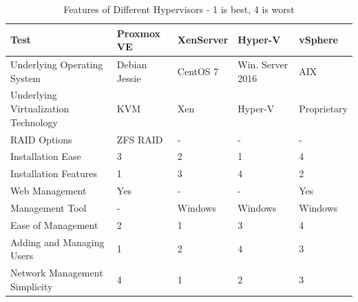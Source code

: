 \documentclass[12pt]{spieman}  %
\begin{document}
\begin{landscape}
\begin{table}
\small
\centering
\caption{Features of Different Hypervisors - 1 is best, 4 is worst}
\label{hypervisors}
\begin{tabular}{|l|l|l|l|l|}
\hline
\rule[-1ex]{0pt}{3.5ex} Test                                                             & Proxmox VE        & XenServer     & Hyper-V             & vSphere           \\ \hline\hline
\rule[-1ex]{0pt}{3.5ex} Underlying Operating System                                      & Debian Jessie     & CentOS 7      & Win. Server 2016 & AIX               \\ \hline
\rule[-1ex]{0pt}{3.5ex} Underlying Virtualization Technology                             & KVM               & Xen           & Hyper-V             & Proprietary       \\ \hline
\rule[-1ex]{0pt}{3.5ex} RAID Options                                                     & ZFS RAID          & -             & -                   & -                 \\ \hline
\rule[-1ex]{0pt}{3.5ex} Installation Ease                                                & 3                 & 2             & 1                   & 4                 \\ \hline
\rule[-1ex]{0pt}{3.5ex} Installation Features                                            & 1                 & 3             & 4                   & 2                 \\ \hline
\rule[-1ex]{0pt}{3.5ex} Web Management                                                   & Yes               & -             & -                   & Yes               \\ \hline
\rule[-1ex]{0pt}{3.5ex} Management Tool                                                  & -                 & Windows       & Windows             & Windows           \\ \hline
\rule[-1ex]{0pt}{3.5ex} Ease of Management                                               & 2                 & 1             & 3                   & 4                 \\ \hline
\rule[-1ex]{0pt}{3.5ex} Adding and Managing Users                                        & 1                 & 2             & 4                   & 3                 \\ \hline
\rule[-1ex]{0pt}{3.5ex} Network Management Simplicity                                    & 4                 & 1             & 2                   & 3                 \\ \hline

\end{tabular}
\end{table}
\end{landscape}
\end{document}
